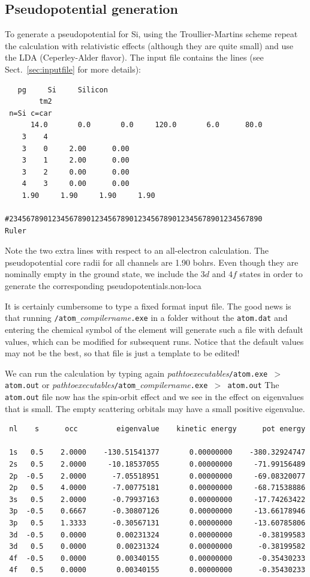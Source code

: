 \documentclass[11pt]{article}
\begin{document}
\subsection{Pseudopotential generation}

To generate a pseudopotential for Si, using
the Troullier-Martins scheme repeat the calculation with relativistic
effects (although they are quite small) and
use the LDA (Ceperley-Alder flavor). The input file
contains the lines (see Sect.~\ref{sec:inputfile} for more
details):

\begin{verbatim}
   pg     Si     Silicon
        tm2
 n=Si c=car
      14.0       0.0       0.0     120.0       6.0      80.0
    3    4
    3    0     2.00      0.00
    3    1     2.00      0.00
    3    2     0.00      0.00
    4    3     0.00      0.00
    1.90     1.90     1.90     1.90

#23456789012345678901234567890123456789012345678901234567890      Ruler
\end{verbatim}

Note the two extra lines with respect to an all-electron calculation.
The pseudopotential core radii for all channels are 1.90 bohrs. Even
though they are nominally empty in the ground state, we include the
$3d$ and $4f$ states in order to generate the corresponding
pseudopotentials.non-loca

It is certainly cumbersome to type a fixed format input file.
The good news is that running
\texttt{/atom\_}\textit{compilername}\texttt{.exe}
in a folder without the \texttt{atom.dat} and entering
the chemical symbol of the element will generate such a file
with default values, which can be modified for subsequent runs.
Notice that the default values may not be the best, so that file
is just a template to be edited!


We can run the calculation by typing again
\textit{pathtoexecutables}\texttt{/atom.exe $>$ atom.out} or
\textit{pathtoexecutables}\texttt{/atom\_}\textit{compilername}\texttt{.exe $>$ atom.out}
The {\tt atom.out} file now has the spin-orbit effect and we
see in the effect on eigenvalues that is small.  The empty scattering orbitals
may have a small positive eigenvalue.

\begin{verbatim}
 nl    s      occ         eigenvalue    kinetic energy      pot energy

 1s   0.5    2.0000    -130.51541377       0.00000000    -380.32924747
 2s   0.5    2.0000     -10.18537055       0.00000000     -71.99156489
 2p  -0.5    2.0000      -7.05518951       0.00000000     -69.08320077
 2p   0.5    4.0000      -7.00775181       0.00000000     -68.71538886
 3s   0.5    2.0000      -0.79937163       0.00000000     -17.74263422
 3p  -0.5    0.6667      -0.30807126       0.00000000     -13.66178946
 3p   0.5    1.3333      -0.30567131       0.00000000     -13.60785806
 3d  -0.5    0.0000       0.00231324       0.00000000      -0.38199583
 3d   0.5    0.0000       0.00231324       0.00000000      -0.38199582
 4f  -0.5    0.0000       0.00340155       0.00000000      -0.35430233
 4f   0.5    0.0000       0.00340155       0.00000000      -0.35430233
\end{verbatim}
\end{document}
